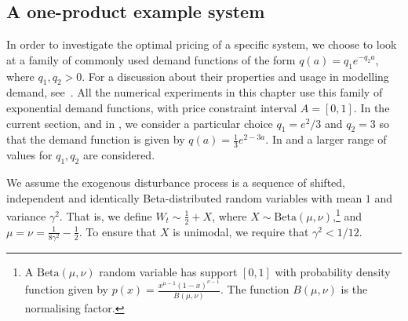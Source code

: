 \documentclass[main.tex]{subfiles}
\begin{document}
\subsection{A one-product example system}\label{subsec:bellman_example_markdown}
In order to investigate the optimal pricing of a specific system, we
choose to look at a family of commonly used demand functions of the form
$q(a)=q_1e^{-q_2a}$, where $q_1,q_2>0$. For a discussion
about their properties and usage in modelling demand, see~\citet[Ch.~7]{talluri2006theory}.
All the numerical experiments in this chapter use this family of exponential
demand functions, with price constraint interval $A=[0,1]$.
In the current section, and in
,
we consider a particular choice  $q_1=e^2/3$ and $q_2=3$ so that the demand
function is given by $q(a)=\frac{1}{3}e^{2-3a}$.
In  and  a larger
range of values for $q_1,q_2$ are considered.

We assume the exogenous disturbance process is a sequence of
shifted, independent and identically Beta-distributed random
variables with mean $1$ and variance
$\gamma^2$. That is, we define $W_t\sim \frac{1}{2}+X$, where
$X\sim \mathrm{Beta}(\mu,\nu)$,\footnote{A
  $\mathrm{Beta}(\mu,\nu)$ random variable has support $[0,1]$ with
  probability density function given by
  $p(x)=\frac{x^{\mu-1}{(1-x)}^{\nu-1}}{B(\mu,\nu)}$.
  The function $B(\mu,\nu)$ is the normalising factor.
}
and $\mu=\nu=\frac{1}{8\gamma^2}-\frac{1}{2}$.
To ensure that $X$ is unimodal, we require that $\gamma^2<1/12$.
\end{document}
